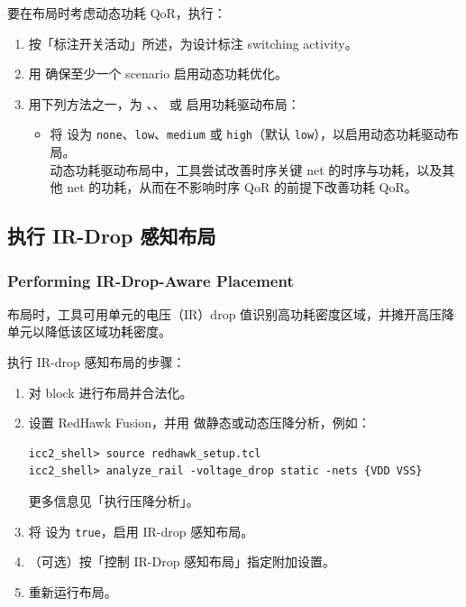 要在布局时考虑动态功耗 QoR，执行：
\begin{enumerate}
  \item 按「标注开关活动」所述，为设计标注 switching activity。
  \item 用  确保至少一个 scenario 启用动态功耗优化。
  \item 用下列方法之一，为 、、 或  启用功耗驱动布局：
        \begin{itemize}
          \item 将  设为 \texttt{none}、\texttt{low}、\texttt{medium} 或 \texttt{high}（默认 \texttt{low}），以启用动态功耗驱动布局。\\
                动态功耗驱动布局中，工具尝试改善时序关键 net 的时序与功耗，以及其他 net 的功耗，从而在不影响时序 QoR 的前提下改善功耗 QoR。
        \end{itemize}
\end{enumerate}

\subsection{执行 IR-Drop 感知布局}
\subsubsection*{Performing IR-Drop-Aware Placement}

布局时，工具可用单元的电压（IR）drop 值识别高功耗密度区域，并摊开高压降单元以降低该区域功耗密度。

执行 IR-drop 感知布局的步骤：
\begin{enumerate}
  \item 对 block 进行布局并合法化。
  \item 设置 RedHawk Fusion，并用  做静态或动态压降分析，例如：
\begin{lstlisting}
icc2_shell> source redhawk_setup.tcl
icc2_shell> analyze_rail -voltage_drop static -nets {VDD VSS}
\end{lstlisting}
        更多信息见「执行压降分析」。
  \item 将  设为 \texttt{true}，启用 IR-drop 感知布局。
  \item （可选）按「控制 IR-Drop 感知布局」指定附加设置。
  \item 重新运行布局。
\end{enumerate}

